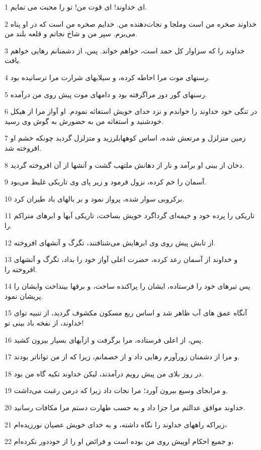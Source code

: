 \par 1 ای خداوند! ای قوت من! تو را محبت می نمایم.
\par 2 خداوند صخره من است وملجا و نجات‌دهنده من. خدایم صخره من است که در او پناه می‌برم. سپر من و شاخ نجاتم و قلعه بلند من.
\par 3 خداوند را که سزاوار کل حمد است، خواهم خواند. پس، از دشمنانم رهایی خواهم یافت.
\par 4 رسنهای موت مرا احاطه کرده، و سیلابهای شرارت مرا ترسانیده بود.
\par 5 رسنهای گور دور مراگرفته بود و دامهای موت پیش روی من درآمده.
\par 6 در تنگی خود خداوند را خواندم و نزد خدای خویش استغاثه نمودم. او آواز مرا از هیکل خودشنید و استغاثه من به حضورش به گوش وی رسید.
\par 7 زمین متزلزل و مرتعش شده، اساس کوههابلرزید و متزلزل گردید چونکه خشم او افروخته شد.
\par 8 دخان از بینی او برآمد و نار از دهانش ملتهب گشت و آتشها از آن افروخته گردید.
\par 9 آسمان را خم کرده، نزول فرمود و زیر پای وی تاریکی غلیظ می‌بود.
\par 10 برکروبی سوار شده، پرواز نمود و بر بالهای باد طیران کرد.
\par 11 تاریکی را پرده خود و خیمه‌ای گرداگرد خویش بساخت، تاریکی آبها و ابرهای متراکم را.
\par 12 از تابش پیش روی وی ابرهایش می‌شتافتند، تگرگ و آتشهای افروخته.
\par 13 و خداوند از آسمان رعد کرده، حضرت اعلی آواز خود را بداد، تگرگ و آتشهای افروخته را.
\par 14 پس تیرهای خود را فرستاده، ایشان را پراکنده ساخت، و برقها بینداخت وایشان را پریشان نمود.
\par 15 آنگاه عمق های آب ظاهر شد و اساس ربع مسکون مکشوف گردید، از تنبیه تو‌ای خداوند، از نفخه باد بینی تو!
\par 16 پس، از اعلی فرستاده، مرا برگرفت و ازآبهای بسیار بیرون کشید.
\par 17 و مرا از دشمنان زورآورم رهایی داد و از خصمانم، زیرا که از من تواناتر بودند.
\par 18 در روز بلای من پیش رویم درآمدند، لیکن خداوند تکیه گاه من بود.
\par 19 و مرابجای وسیع بیرون آورد؛ مرا نجات داد زیرا که درمن رغبت می‌داشت.
\par 20 خداوند موافق عدالتم مرا جزا داد و به حسب طهارت دستم مرا مکافات رسانید.
\par 21 زیراکه راههای خداوند را نگاه داشته، و به خدای خویش عصیان نورزیده‌ام،
\par 22 و جمیع احکام اوپیش روی من بوده است و فرائض او را از خوددور نکرده‌ام،
